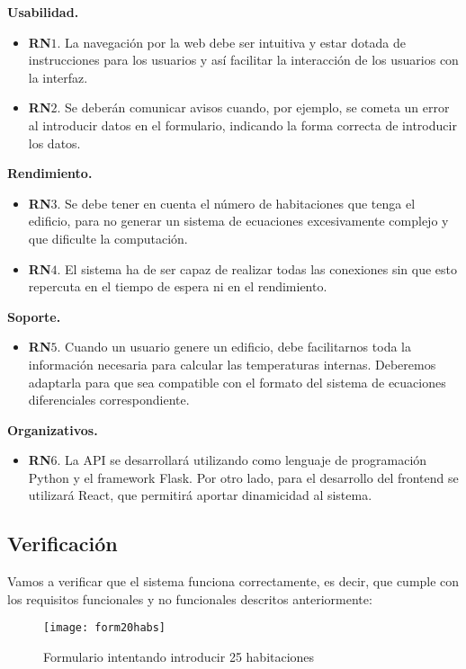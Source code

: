 \noindent \textbf{Usabilidad.}
\begin{itemize}
	\item \textbf{RN$1$}. La navegación por la web debe ser intuitiva y estar dotada de instrucciones para los usuarios y así facilitar la interacción de los usuarios con la interfaz.
	\item \textbf{RN$2$}. Se deberán comunicar avisos cuando, por ejemplo, se cometa un error al introducir datos en el formulario, indicando la forma correcta de introducir los datos.
\end{itemize}
\textbf{Rendimiento.}
\begin{itemize}
	\item \textbf{RN$3$}. Se debe tener en cuenta el número de habitaciones que tenga el edificio, para no generar un sistema de ecuaciones excesivamente complejo y que dificulte la computación.
	\item \textbf{RN$4$}. El sistema ha de ser capaz de realizar todas las conexiones sin que esto repercuta en el tiempo de espera ni en el rendimiento.
\end{itemize}
\textbf{Soporte.}
\begin{itemize}
	\item \textbf{RN$5$}. Cuando un usuario genere un edificio, debe facilitarnos toda la información necesaria para calcular las temperaturas internas. Deberemos adaptarla para que sea compatible con el formato del sistema de ecuaciones diferenciales correspondiente.
\end{itemize}
\textbf{Organizativos.}
\begin{itemize}
	\item \textbf{RN$6$}. La API se desarrollará utilizando como lenguaje de programación Python y el framework Flask. Por otro lado, para el desarrollo del frontend se utilizará React, que permitirá aportar dinamicidad al sistema.
\end{itemize}
\subsection{Verificación}
Vamos a verificar que el sistema funciona correctamente, es decir, que cumple con los requisitos funcionales y no funcionales descritos anteriormente:
\begin{figure}[h!]
	\centering
	\texttt{[image: form20habs]}
	\caption{Formulario intentando introducir 25 habitaciones}
	\label{fig:20habs}
\end{figure}

